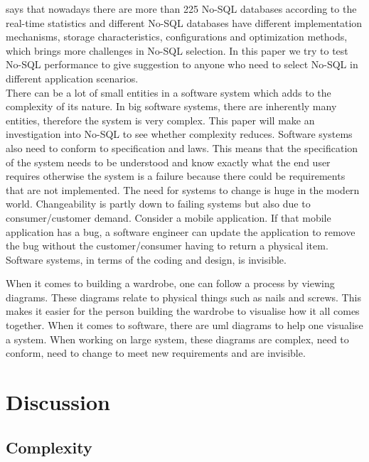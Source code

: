 \documentclass{article} %
\begin{document}
\cite{tang2016performance} says that nowadays there are more than 225 No-SQL databases
according to the real-time statistics and different
No-SQL databases have different implementation mechanisms,
storage characteristics, configurations and optimization
methods, which brings more challenges in No-SQL selection. In
this paper we try to test No-SQL performance to give
suggestion to anyone who need to select No-SQL in different
application scenarios.\\

There can be a lot of small entities in a software system which adds to the complexity of its nature. 
In big software systems, there are inherently many entities, therefore the system is very complex. This paper will make an investigation into No-SQL to see 
whether complexity reduces.   Software systems also need to conform to specification 
and laws. This means that the specification of the system needs to be understood and know exactly what 
the end user requires otherwise the system is a failure because there could be requirements that are 
not implemented. 
The need for systems to change is huge in the modern world. Changeability
is partly down to failing systems but also due to consumer/customer demand. Consider a mobile application.
If that mobile application has a bug, a software engineer can update the application to remove the
bug without the customer/consumer having to return a physical item. Software systems, in terms of 
the coding and design, is invisible. 


When it comes to building a wardrobe, one can follow a 
process by viewing diagrams. These diagrams relate to physical things such as nails and screws.
This makes it easier for the person building the wardrobe to visualise how it all comes together.
When it comes to software, there are \acrshort{uml} diagrams to help one visualise a system. 
When working on large system, these diagrams are complex, need to conform, need to change to
meet new requirements and are invisible.  


\section{Discussion} %
\subsection{Complexity}
\end{document}
